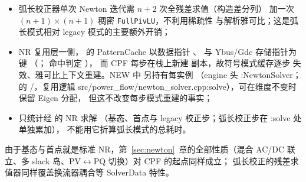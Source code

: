 \begin{itemize}
  \item 弧长校正器单次 Newton 迭代需 $n+2$ 次全残差求值（构造差分列）
        加一次 $(n+1)\times(n+1)$ 稠密 \texttt{FullPivLU}，不利用稀疏性
        与解析雅可比；这是弧长模式相对 legacy 模式的主要额外开销；
  \item NR 复用层一侧， 的 PatternCache 以数据指针
        、 与 Ybus/Gdc 存储指针为键
        （；
        命中判定 ），
        而 CPF 每步在栈上新建  副本，故符号模式缓存逐步
        失效、雅可比上下文重建。NEW 中  另持有每实例
        （engine 头 :NewtonSolver；
         的
        /，复用逻辑
        src/power\_flow/newton\_solver.cpp:solve），可在维度不变时保留 Eigen 分配，
        但这不改变每步模式重建的事实；
  \item {} 只统计经  的 NR 求解
        （基态、首点与 legacy 校正步；弧长校正步在 :solve 处单独累加），
        不能用它折算弧长模式的总耗时。
\end{itemize}
由于基态与首点就是标准 NR，第~\ref{sec:newton}~章的全部性质（混合 AC/DC
联立、多 slack 岛、PV$\leftrightarrow$PQ 切换）对 CPF 的起点同样成立；
弧长校正的残差求值器同样覆盖换流器耦合等 SolverData 特性。

